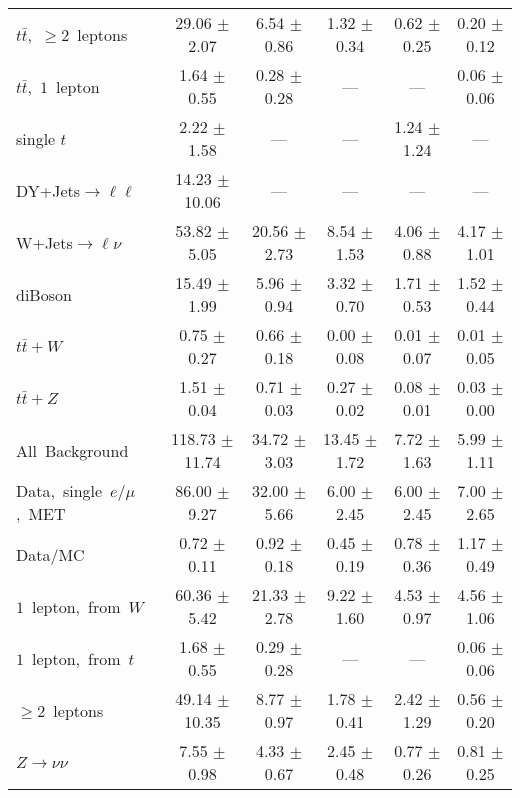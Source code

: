 \documentclass{article}
\begin{document}
\begin{longtable}{|l|c|c|c|c|c|}
$t\bar{t}$,~$\ge2$~leptons & 29.06 $\pm$ 2.07  & 6.54 $\pm$ 0.86  & 1.32 $\pm$ 0.34  & 0.62 $\pm$ 0.25  & 0.20 $\pm$ 0.12 \\* 
$t\bar{t}$,~$1$~lepton & 1.64 $\pm$ 0.55  & 0.28 $\pm$ 0.28  & ---  & ---  & 0.06 $\pm$ 0.06 \\* 
single $t$  & 2.22 $\pm$ 1.58  & ---  & ---  & 1.24 $\pm$ 1.24  & --- \\* 
DY+Jets$\rightarrow\ell\ell$  & 14.23 $\pm$ 10.06  & ---  & ---  & ---  & --- \\* 
W+Jets$\rightarrow\ell\nu$  & 53.82 $\pm$ 5.05  & 20.56 $\pm$ 2.73  & 8.54 $\pm$ 1.53  & 4.06 $\pm$ 0.88  & 4.17 $\pm$ 1.01 \\* 
diBoson  & 15.49 $\pm$ 1.99  & 5.96 $\pm$ 0.94  & 3.32 $\pm$ 0.70  & 1.71 $\pm$ 0.53  & 1.52 $\pm$ 0.44 \\* 
$t\bar{t}+W$  & 0.75 $\pm$ 0.27  & 0.66 $\pm$ 0.18  & 0.00 $\pm$ 0.08  & 0.01 $\pm$ 0.07  & 0.01 $\pm$ 0.05 \\* 
$t\bar{t}+Z$  & 1.51 $\pm$ 0.04  & 0.71 $\pm$ 0.03  & 0.27 $\pm$ 0.02  & 0.08 $\pm$ 0.01  & 0.03 $\pm$ 0.00 \\* 
\hline \hline 
All~Background  & 118.73 $\pm$ 11.74  & 34.72 $\pm$ 3.03  & 13.45 $\pm$ 1.72  & 7.72 $\pm$ 1.63  & 5.99 $\pm$ 1.11 \\* 
Data,~single~$e/\mu$,~MET  & 86.00 $\pm$ 9.27  & 32.00 $\pm$ 5.66  & 6.00 $\pm$ 2.45  & 6.00 $\pm$ 2.45  & 7.00 $\pm$ 2.65 \\* 
Data/MC  & 0.72 $\pm$ 0.11  & 0.92 $\pm$ 0.18  & 0.45 $\pm$ 0.19  & 0.78 $\pm$ 0.36  & 1.17 $\pm$ 0.49 \\* 
\hline \hline 
$1$~lepton,~from~$W$  & 60.36 $\pm$ 5.42  & 21.33 $\pm$ 2.78  & 9.22 $\pm$ 1.60  & 4.53 $\pm$ 0.97  & 4.56 $\pm$ 1.06 \\* 
$1$~lepton,~from~$t$  & 1.68 $\pm$ 0.55  & 0.29 $\pm$ 0.28  & ---  & ---  & 0.06 $\pm$ 0.06 \\* 
$\ge2$~leptons  & 49.14 $\pm$ 10.35  & 8.77 $\pm$ 0.97  & 1.78 $\pm$ 0.41  & 2.42 $\pm$ 1.29  & 0.56 $\pm$ 0.20 \\* 
$Z\rightarrow\nu\nu$  & 7.55 $\pm$ 0.98  & 4.33 $\pm$ 0.67  & 2.45 $\pm$ 0.48  & 0.77 $\pm$ 0.26  & 0.81 $\pm$ 0.25 \\* 
\hline 
\end{longtable} 

 
 
 
 
\pagebreak 

 
 
 
 
\end{document}

